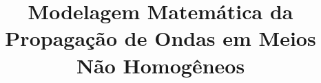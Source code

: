               
%
%
%
% 
%
%
\title{Modelagem Matemática da Propagação de Ondas em
Meios Não Homogêneos}

\documentclass[12pt, a4paper]{report}
\usepackage[utf8]{inputenc}
\usepackage[brazil]{babel}
\usepackage[T1]{fontenc}
\usepackage[left=3cm, right=2cm, bottom=2cm, top=3cm]{geometry}
\usepackage[pdftex, hidelinks]{hyperref}
\usepackage{gensymb}

\usepackage{setspace}
\usepackage{graphicx} %
\usepackage{float}
\usepackage{mathptmx}
\usepackage{amsmath}

\allowdisplaybreaks

\usepackage{subfig}

\usepackage[final]{pdfpages}

\usepackage[toc,page]{appendix}

